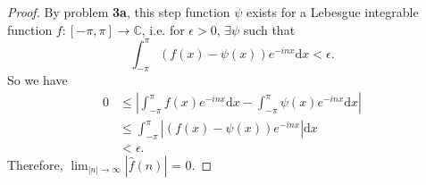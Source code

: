 \documentclass{article}
\newcommand{\C}{\mathbb{C}} %
\begin{document}
\begin{proof}
	By problem \textbf{3a}, this step function $\psi$ exists for a Lebesgue integrable function $f: [-\pi, \pi] \to \C$, i.e. for $\epsilon > 0$, $\exists \psi$ such that
	\begin{equation}
		\int_{-\pi}^{\pi} \left(f(x) - \psi(x)\right) e^{-inx} \mathrm{d}x < \epsilon.
	\end{equation}
	So we have
	\begin{align}
		0 &\leq \left|\int_{-\pi}^{\pi} f(x)e^{-inx}\mathrm{d}x - \int_{-\pi}^{\pi}\psi(x)e^{-inx}\mathrm{d}x\right| \\
		&\leq \int_{-\pi}^{\pi} \left|(f(x) - \psi(x))e^{-inx}\right| \mathrm{d}x \\
		&< \epsilon.
	\end{align}
	Therefore, $\lim_{|n| \to \infty} |\hat{f}(n)|$ = 0.
\end{proof}
\end{document}
